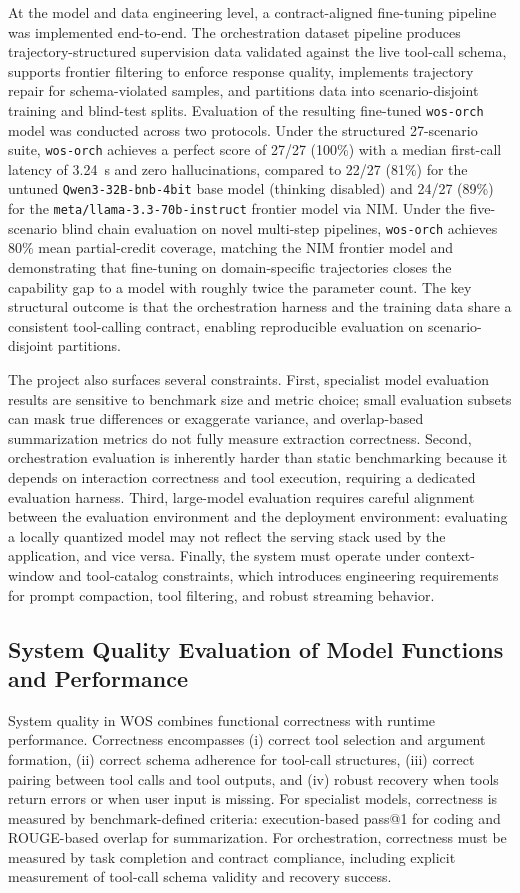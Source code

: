 \documentclass[conference]{IEEEtran}
\begin{document}
At the model and data engineering level, a contract-aligned fine-tuning pipeline was implemented end-to-end. The orchestration dataset pipeline produces trajectory-structured supervision data validated against the live tool-call schema, supports frontier filtering to enforce response quality, implements trajectory repair for schema-violated samples, and partitions data into scenario-disjoint training and blind-test splits. Evaluation of the resulting fine-tuned \texttt{wos-orch} model was conducted across two protocols. Under the structured 27-scenario suite, \texttt{wos-orch} achieves a perfect score of 27/27 (100\%) with a median first-call latency of 3.24~s and zero hallucinations, compared to 22/27 (81\%) for the untuned \texttt{Qwen3-32B-bnb-4bit} base model (thinking disabled) and 24/27 (89\%) for the \texttt{meta/llama-3.3-70b-instruct} frontier model via NIM. Under the five-scenario blind chain evaluation on novel multi-step pipelines, \texttt{wos-orch} achieves 80\% mean partial-credit coverage, matching the NIM frontier model and demonstrating that fine-tuning on domain-specific trajectories closes the capability gap to a model with roughly twice the parameter count. The key structural outcome is that the orchestration harness and the training data share a consistent tool-calling contract, enabling reproducible evaluation on scenario-disjoint partitions.

The project also surfaces several constraints. First, specialist model evaluation results are sensitive to benchmark size and metric choice; small evaluation subsets can mask true differences or exaggerate variance, and overlap-based summarization metrics do not fully measure extraction correctness. Second, orchestration evaluation is inherently harder than static benchmarking because it depends on interaction correctness and tool execution, requiring a dedicated evaluation harness. Third, large-model evaluation requires careful alignment between the evaluation environment and the deployment environment: evaluating a locally quantized model may not reflect the serving stack used by the application, and vice versa. Finally, the system must operate under context-window and tool-catalog constraints, which introduces engineering requirements for prompt compaction, tool filtering, and robust streaming behavior.

\subsection{System Quality Evaluation of Model Functions and Performance}
System quality in WOS combines functional correctness with runtime performance. Correctness encompasses (i) correct tool selection and argument formation, (ii) correct schema adherence for tool-call structures, (iii) correct pairing between tool calls and tool outputs, and (iv) robust recovery when tools return errors or when user input is missing. For specialist models, correctness is measured by benchmark-defined criteria: execution-based pass@1 for coding and ROUGE-based overlap for summarization. For orchestration, correctness must be measured by task completion and contract compliance, including explicit measurement of tool-call schema validity and recovery success.
\end{document}
